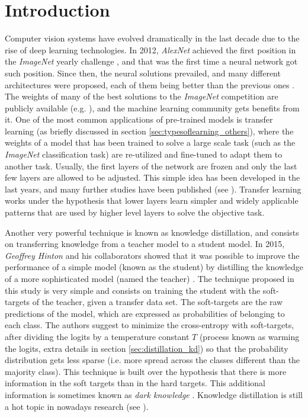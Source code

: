 \section{Introduction}
Computer vision systems have evolved dramatically in the last decade due to the rise of deep learning technologies. In 2012, \textit{AlexNet} \cite{krizhevsky2012} achieved the first position in the \textit{ImageNet} yearly challenge \cite{ILSVRC15}, and that was the first time a neural network got such position. Since then, the neural solutions prevailed, and many different architectures were proposed, each of them being better than the previous ones \cite{khan2020, algan2021}. The weights of many of the best solutions to the \textit{ImageNet} competition are publicly available (e.g. \cite{he2016, chollet2017, szegedy2016, szegedy2017, howard2017, pham2018, tan2019}), and the machine learning community gets benefits from it. One of the most common applications of pre-trained models is transfer learning \cite{huang2021} (as briefly discussed in section \ref{sec:typesoflearning_others}), where the weights of a model that has been trained to solve a large scale task (such as the \textit{ImageNet} classification task) are re-utilized and fine-tuned to adapt them to another task. Usually, the first layers of the network are frozen and only the last few layers are allowed to be adjusted. This simple idea has been developed in the last years, and many further studies have been published (see \cite{zhu2018, wu2021, pzhao2021}). Transfer learning works under the hypothesis that lower layers learn simpler and widely applicable patterns that are used by higher level layers to solve the objective task.

Another very powerful technique is known as knowledge distillation, and consists on transferring knowledge from a teacher model to a student model. In 2015, \textit{Geoffrey Hinton} and his collaborators showed that it was possible to improve the performance of a simple model (known as the student) by distilling the knowledge of a more sophisticated model (named the teacher) \cite{hinton2015}. The technique proposed in this study is very simple and consists on training the student with the soft-targets of the teacher, given a transfer data set. The soft-targets are the raw predictions of the model, which are expressed as probabilities of belonging to each class. The authors suggest to minimize the cross-entropy with soft-targets, after dividing the logits by a temperature constant $T$ (process known as warming the logits, extra details in section \ref{sec:distillation_kd}) so that the probability distribution gets less sparse (i.e. more spread across the classes different than the majority class). This technique is built over the hypothesis that there is more information in the soft targets than in the hard targets. This additional information is sometimes known as \textit{dark knowledge} \cite{gou2020}. Knowledge distillation is still a hot topic in nowadays research (see \cite{tan2021, zhao2021, lee2021}).


